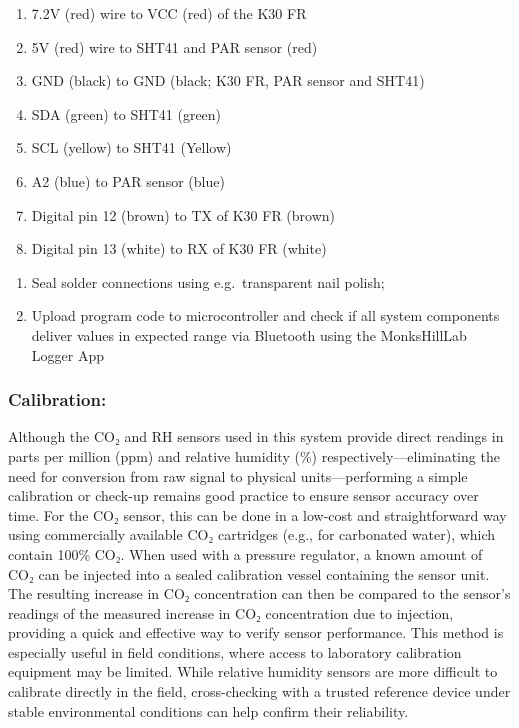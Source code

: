 \documentclass[
  11pt,
  letterpaper,
]{book}
\providecommand{\tightlist}{%
  \setlength{\itemsep}{0pt}\setlength{\parskip}{0pt}}
\begin{document}
\begin{enumerate}
\def\labelenumi{\alph{enumi}.}
\tightlist
\item
  7.2V (red) wire to VCC (red) of the K30 FR\\
\item
  5V (red) wire to SHT41 and PAR sensor (red)\\
\item
  GND (black) to GND (black; K30 FR, PAR sensor and SHT41)\\
\item
  SDA (green) to SHT41 (green)\\
\item
  SCL (yellow) to SHT41 (Yellow)\\
\item
  A2 (blue) to PAR sensor (blue)\\
\item
  Digital pin 12 (brown) to TX of K30 FR (brown)\\
\item
  Digital pin 13 (white) to RX of K30 FR (white)
\end{enumerate}

\begin{enumerate}
\def\labelenumi{\arabic{enumi}.}
\setcounter{enumi}{18}
\tightlist
\item
  Seal solder connections using e.g.~transparent nail polish;
\item
  Upload program code to microcontroller and check if all system
  components deliver values in expected range via Bluetooth using the
  MonksHillLab Logger App
\end{enumerate}

\subsubsection{Calibration:}\label{sec-manual-flux-calibration}

Although the CO₂ and RH sensors used in this system provide direct
readings in parts per million (ppm) and relative humidity (\%)
respectively---eliminating the need for conversion from raw signal to
physical units---performing a simple calibration or check-up remains
good practice to ensure sensor accuracy over time. For the CO₂ sensor,
this can be done in a low-cost and straightforward way using
commercially available CO₂ cartridges (e.g., for carbonated water),
which contain 100\% CO₂. When used with a pressure regulator, a known
amount of CO₂ can be injected into a sealed calibration vessel
containing the sensor unit. The resulting increase in CO₂ concentration
can then be compared to the sensor's readings of the measured increase
in CO₂ concentration due to injection, providing a quick and effective
way to verify sensor performance. This method is especially useful in
field conditions, where access to laboratory calibration equipment may
be limited. While relative humidity sensors are more difficult to
calibrate directly in the field, cross-checking with a trusted reference
device under stable environmental conditions can help confirm their
reliability.
\end{document}
